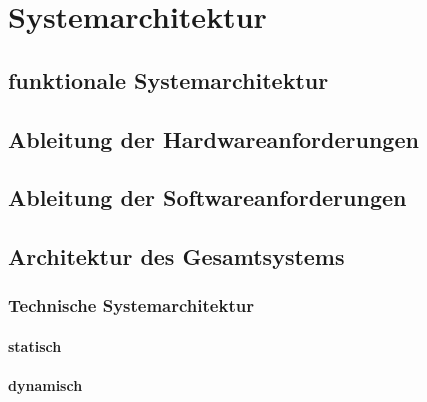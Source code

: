 \chapter{Systemarchitektur}
\label{cha:Systemarchitektur}

\section{funktionale Systemarchitektur}
\section{Ableitung der Hardwareanforderungen}
\section{Ableitung der Softwareanforderungen}

\section{Architektur des Gesamtsystems}

\subsection{Technische Systemarchitektur}

\subsubsection{statisch}
\subsubsection{dynamisch}
